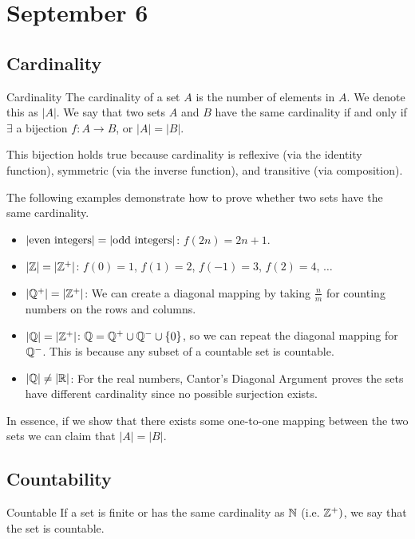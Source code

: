 \chapter{September 6}

\section{Cardinality}
\begin{definition}{Cardinality}{}
    The cardinality of a set $A$ is the number of elements in $A$. We denote this as $|A|$. We say that two sets $A$ and $B$ have the same cardinality if and only if $\exists$ a bijection $f: A \rightarrow B$, or $|A| = |B|$.
\end{definition}
\begin{note}
    This bijection holds true because cardinality is reflexive (via the identity function), symmetric (via the inverse function), and transitive (via composition).
\end{note}

\begin{note}
    The following examples demonstrate how to prove whether two sets have the same cardinality.
\end{note}
\begin{itemize}
    \item $|\textnormal{even integers}| = |\textnormal{odd integers}|$: $f(2n) = 2n + 1$.
    \item $|\mathbb{Z}| = |\mathbb{Z}^+|$: $f(0) = 1$, $f(1) = 2$, $f(-1) = 3$, $f(2) = 4$, $\ldots$
    \item $|\mathbb{Q}^+| = |\mathbb{Z}^+|$: We can create a diagonal mapping by taking $\frac{n}{m}$ for counting numbers on the rows and columns.
    \item $|\mathbb{Q}| = |\mathbb{Z}^+|$: $\mathbb{Q} = \mathbb{Q}^+ \cup \mathbb{Q}^- \cup \{0\}$, so we can repeat the diagonal mapping for $\mathbb{Q}^-$. This is because any subset of a countable set is countable.
    \item $|\mathbb{Q}| \neq |\mathbb{R}|$: For the real numbers, Cantor's Diagonal Argument proves the sets have different cardinality since no possible surjection exists.
\end{itemize}
In essence, if we show that there exists some one-to-one mapping between the two sets we can claim that $|A| = |B|$.

\section{Countability}
\begin{definition}{Countable}{}
    If a set is finite or has the same cardinality as $\mathbb{N}$ (i.e. $\mathbb{Z}^+)$, we say that the set is countable.
\end{definition}

